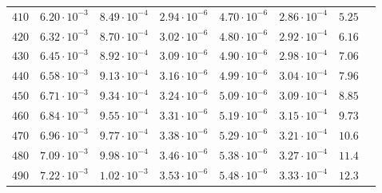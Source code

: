 \begin{table}
\begin{tabular}{lccccccc}
$410 $&$ 6.20\cdot 10^{-3} $&$ 8.49\cdot 10^{-4} $&$ 2.94\cdot 10^{-6} $&$ 4.70\cdot 10^{-6} $&$ 2.86\cdot 10^{-4} $&$ 5.25  $\\
$420 $&$ 6.32\cdot 10^{-3} $&$ 8.70\cdot 10^{-4} $&$ 3.02\cdot 10^{-6} $&$ 4.80\cdot 10^{-6} $&$ 2.92\cdot 10^{-4} $&$ 6.16  $\\
$430 $&$ 6.45\cdot 10^{-3} $&$ 8.92\cdot 10^{-4} $&$ 3.09\cdot 10^{-6} $&$ 4.90\cdot 10^{-6} $&$ 2.98\cdot 10^{-4} $&$ 7.06  $\\
$440 $&$ 6.58\cdot 10^{-3} $&$ 9.13\cdot 10^{-4} $&$ 3.16\cdot 10^{-6} $&$ 4.99\cdot 10^{-6} $&$ 3.04\cdot 10^{-4} $&$ 7.96  $\\
$450 $&$ 6.71\cdot 10^{-3} $&$ 9.34\cdot 10^{-4} $&$ 3.24\cdot 10^{-6} $&$ 5.09\cdot 10^{-6} $&$ 3.09\cdot 10^{-4} $&$ 8.85  $\\
$460 $&$ 6.84\cdot 10^{-3} $&$ 9.55\cdot 10^{-4} $&$ 3.31\cdot 10^{-6} $&$ 5.19\cdot 10^{-6} $&$ 3.15\cdot 10^{-4} $&$ 9.73  $\\
$470 $&$ 6.96\cdot 10^{-3} $&$ 9.77\cdot 10^{-4} $&$ 3.38\cdot 10^{-6}
$&$ 5.29\cdot 10^{-6} $&$ 3.21\cdot 10^{-4} $&$ 10.6 $\\
$480 $&$ 7.09\cdot 10^{-3} $&$ 9.98\cdot 10^{-4} $&$ 3.46\cdot 10^{-6}
$&$ 5.38\cdot 10^{-6} $&$ 3.27\cdot 10^{-4} $&$ 11.4 $\\
$490 $&$ 7.22\cdot 10^{-3} $&$ 1.02\cdot 10^{-3} $&$ 3.53\cdot 10^{-6}
$&$ 5.48\cdot 10^{-6} $&$ 3.33\cdot 10^{-4} $&$ 12.3 $\\
\hline
  \end{tabular}
\end{table}

